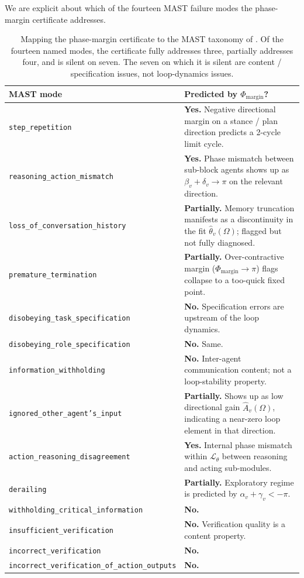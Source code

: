 \documentclass[11pt,a4paper]{article}
\theoremstyle{definition}
\theoremstyle{remark}
\newcommand{\agent}{\mathcal{L}_{\theta}}
\newcommand{\PhaseMargin}{\Phi_{\mathrm{margin}}}
\begin{document}
We are explicit about which of the fourteen MAST failure modes the
phase-margin certificate addresses.

\begin{table}[h]
\centering
\small
\renewcommand{\arraystretch}{1.15}
\begin{tabular}{@{}p{}p{}@{}}
\toprule
\textbf{MAST mode} & \textbf{Predicted by $\PhaseMargin$?} \\
\midrule
\texttt{step\_repetition} & \textbf{Yes.}  Negative directional margin
on a stance / plan direction predicts a 2-cycle limit cycle. \\
\texttt{reasoning\_action\_mismatch} & \textbf{Yes.}  Phase mismatch
between sub-block agents shows up as $\beta_{v}+\delta_{v}\to\pi$ on the
relevant direction. \\
\texttt{loss\_of\_conversation\_history} & \textbf{Partially.} Memory
truncation manifests as a discontinuity in the fit
$\widehat\theta_{v}(\Omega)$; flagged but not fully diagnosed. \\
\texttt{premature\_termination} & \textbf{Partially.} Over-contractive
margin ($\PhaseMargin\to\pi$) flags collapse to a too-quick fixed point. \\
\texttt{disobeying\_task\_specification} & \textbf{No.}  Specification
errors are upstream of the loop dynamics. \\
\texttt{disobeying\_role\_specification} & \textbf{No.}  Same. \\
\texttt{information\_withholding} & \textbf{No.}  Inter-agent
communication content; not a loop-stability property. \\
\texttt{ignored\_other\_agent's\_input} & \textbf{Partially.} Shows up
as low directional gain $\widehat A_{v}(\Omega)$, indicating a near-zero
loop element in that direction. \\
\texttt{action\_reasoning\_disagreement} & \textbf{Yes.}  Internal phase
mismatch within $\agent$ between reasoning and acting sub-modules. \\
\texttt{derailing} & \textbf{Partially.}  Exploratory regime is
predicted by $\alpha_{v}+\gamma_{v}<-\pi$. \\
\texttt{withholding\_critical\_information} & \textbf{No.} \\
\texttt{insufficient\_verification} & \textbf{No.}  Verification quality
is a content property. \\
\texttt{incorrect\_verification} & \textbf{No.} \\
\texttt{incorrect\_verification\_of\_action\_outputs} & \textbf{No.} \\
\bottomrule
\end{tabular}
\caption{Mapping the phase-margin certificate to the MAST taxonomy of
\citet{Cemri2025MAST}.  Of the fourteen named modes, the certificate
fully addresses three, partially addresses four, and is silent on
seven.  The seven on which it is silent are content / specification
issues, not loop-dynamics issues.}
\label{tab:mast-mapping}
\end{table}
\end{document}
